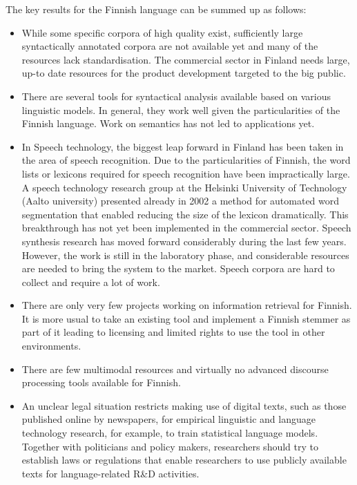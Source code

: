 \begin{multicols}{2}
The key results for the Finnish language can be summed up as follows:

\begin{itemize}
\item While some specific corpora of high quality exist, sufficiently large
  syntactically annotated corpora are not available yet and many of the
    resources lack standardisation. The commercial sector in Finland needs
    large, up-to date resources for the product development targeted to the big
    public.

\item There are several tools for syntactical analysis available based on various
  linguistic models. In general, they work well given the particularities of
    the Finnish language. Work on semantics has not led to applications yet.

\item In Speech technology, the biggest leap forward in Finland has been taken in
  the area of speech recognition. Due to the particularities of Finnish, the
    word lists or lexicons required for speech recognition have been
    impractically large. A speech technology research group at the Helsinki
    University of Technology (Aalto university) presented already in 2002 a method for automated
    word segmentation that enabled reducing the size of the lexicon
    dramatically. This breakthrough has not yet been implemented in the
    commercial sector. Speech synthesis research has moved forward considerably
    during the last few years. However, the work is still in the laboratory
    phase, and considerable resources are needed to bring the system to the
    market. Speech corpora are hard to collect and require a lot of work.

\item There are only very few projects working on information retrieval for
    Finnish. It is more usual to take an existing tool and implement a Finnish
    stemmer as part of it leading to licensing and limited rights to use the
    tool in other environments.

\item There are few multimodal resources and virtually no advanced discourse
    processing tools available for Finnish.

\item An unclear legal situation restricts making use of digital texts, such as
    those published online by newspapers, for empirical linguistic and language
    technology research, for example, to train statistical language models.
    Together with politicians and policy makers, researchers should try to
    establish laws or regulations that enable researchers to use publicly
    available texts for language-related R\&D activities.
\end{itemize}


\end{multicols}
